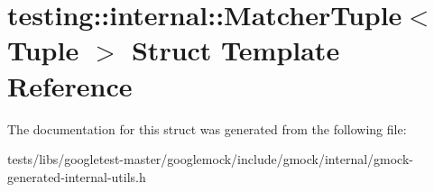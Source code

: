 \hypertarget{structtesting_1_1internal_1_1MatcherTuple}{}\section{testing\+:\+:internal\+:\+:Matcher\+Tuple$<$ Tuple $>$ Struct Template Reference}
\label{structtesting_1_1internal_1_1MatcherTuple}


The documentation for this struct was generated from the following file\+:\begin{DoxyCompactItemize}
\item 
tests/libs/googletest-\/master/googlemock/include/gmock/internal/gmock-\/generated-\/internal-\/utils.\+h\end{DoxyCompactItemize}
